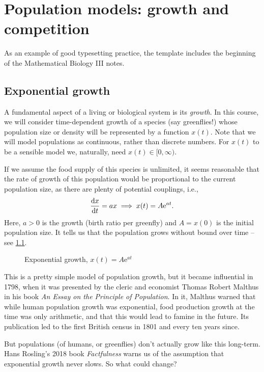 \documentclass[12pt,a4paper,openany,twoside]{book}
\renewcommand{\d}{{\mathrm d}}
\newcommand{\fd}[2]{\mathchoice{\frac{\d #1}{\d #2}}{\d #1/\d #2}{\d #1/\d #2}{\d #1/\d #2}}
\newcommand{\e}{\mathrm{e}}
\begin{document}
\chapter{Population models: growth and competition}
\label{chap:growth}

As an example of good typesetting practice, the template includes the beginning of the Mathematical Biology III notes.

\section{Exponential growth}
A fundamental aspect of a living or biological system is its \emph{growth}. In this course, we will consider time-dependent growth of a species (say greenflies!) whose population size or density will be represented by a function $x(t)$. Note that we will model populations as continuous, rather than discrete numbers. For $x(t)$ to be a sensible model we, naturally, need $x(t)\in[0,\infty)$.

If we assume the food supply of this species is unlimited, it seems reasonable that the rate of growth of this population would be proportional to the current population size, as there are plenty of potential couplings, i.e.,
\begin{equation}\label{exp_growth_model}
	\fd{x}{t} = a x \implies x(t) = A\e^{a t}.
\end{equation}
Here, $a>0$ is the growth (birth ratio per greenfly) and $A = x(0)$ is the initial population size. It tells us that the population grows without bound over time -- see \cref{fig:exponential-growth}.

\begin{figure}%
	\centering%
	
	\caption[Exponential growth]{Exponential growth, $x(t) = A\e^{a t}$}
	\label{fig:exponential-growth}
\end{figure}

This is a pretty simple model of population growth, but it became influential in 1798, when it was presented by the cleric and economist Thomas Robert Malthus in his book \emph{An Essay on the Principle of Population}. In it, Malthus warned that while human population growth was exponential, food production growth at the time was only arithmetic, and that this would lead to famine in the future. Its publication led to the first British census in 1801 and every ten years since.

But populations (of humans, or greenflies) don't actually grow like this long-term. Hans Rosling's 2018 book \emph{Factfulness} warns us of the assumption that exponential growth never slows. So what could change? 
\end{document}
